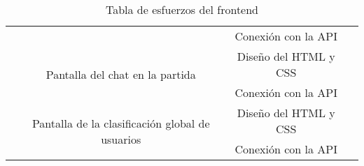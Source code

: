 \documentclass[11pt, a4paper, titlepage]{article}
\begin{document}
\begin{landscape}
\begin{table}[hbt!]
\begin{tabular}{c|ccll|cc|}
\multicolumn{1}{|c|}{}                            & \multicolumn{1}{c|}{}                                                                                           & \multicolumn{3}{c|}{Conexión con la API}                                                                       & \multicolumn{2}{c|}{}                                                        \\ \cline{2-5}
\multicolumn{1}{|c|}{}                            & \multicolumn{1}{c|}{\multirow{2}{*}{Pantalla del chat en la partida}}                                           & \multicolumn{3}{c|}{Diseño del HTML y CSS}                                                                     & \multicolumn{2}{c|}{}                                                        \\ \cline{3-5}
\multicolumn{1}{|c|}{}                            & \multicolumn{1}{c|}{}                                                                                           & \multicolumn{3}{c|}{Conexión con la API}                                                                       & \multicolumn{2}{c|}{}                                                        \\ \cline{2-5}
\multicolumn{1}{|c|}{}                            & \multicolumn{1}{c|}{\multirow{2}{*}{Pantalla de la clasificación global de usuarios}}                           & \multicolumn{3}{c|}{Diseño del HTML y CSS}                                                                     & \multicolumn{2}{c|}{}                                                        \\ \cline{3-5}
\multicolumn{1}{|c|}{}                            & \multicolumn{1}{c|}{}                                                                                           & \multicolumn{3}{c|}{Conexión con la API}                                                                       & \multicolumn{2}{c|}{}                                                        \\ \hline
\end{tabular}
\caption{Tabla de esfuerzos del frontend}
\label{table:frontend}
\end{table}
\end{landscape}
\FloatBarrier    

\newpage
\end{document}
